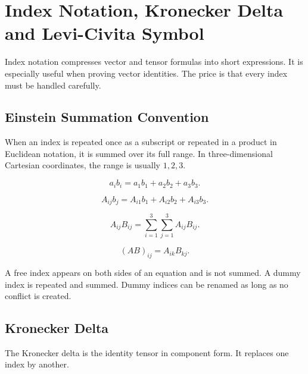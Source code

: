 \documentclass{otscience}
\begin{document}
\maketitle
\tableofcontents
\newpage
\fi

\section{Index Notation, Kronecker Delta and Levi-Civita Symbol}

Index notation compresses vector and tensor formulas into short expressions. It is especially useful when proving vector identities. The price is that every index must be handled carefully.

\subsection{Einstein Summation Convention}

When an index is repeated once as a subscript or repeated in a product in Euclidean notation, it is summed over its full range. In three-dimensional Cartesian coordinates, the range is usually \(1,2,3\).

\begin{formulaboxnosplit}
    \[
        a_i b_i=a_1b_1+a_2b_2+a_3b_3.
    \]

    \[
        A_{ij}b_j=A_{i1}b_1+A_{i2}b_2+A_{i3}b_3.
    \]

    \[
        A_{ij}B_{ij}=\sum_{i=1}^{3}\sum_{j=1}^{3}A_{ij}B_{ij}.
    \]

    \[
        {(A B)}_{ij}=A_{ik}B_{kj}.
    \]
\end{formulaboxnosplit}

A free index appears on both sides of an equation and is not summed. A dummy index is repeated and summed. Dummy indices can be renamed as long as no conflict is created.

\subsection{Kronecker Delta}

The Kronecker delta is the identity tensor in component form. It replaces one index by another.
\end{document}
